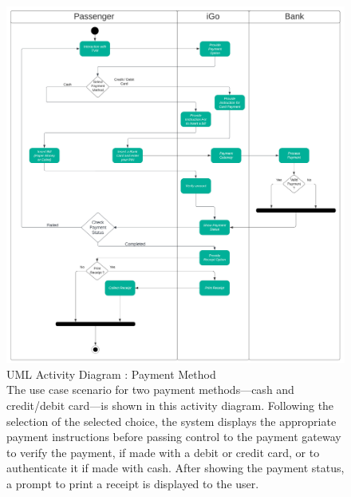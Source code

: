 \documentclass[a4paper, 11pt]{report}
\begin{document}
\begin{figure}[h]
    \centering
    \includegraphics[scale=0.15]{Activity_Diagram_Payment_Method.png}
    \caption{UML Activity Diagram : Payment Method\\ 
    The use case scenario for two payment methods—cash and credit/debit card—is shown in this activity diagram. Following the selection of the selected choice, the system displays the appropriate payment instructions before passing control to the payment gateway to verify the payment, if made with a debit or credit card, or to authenticate it if made with cash. After showing the payment status, a prompt to print a receipt is displayed to the user.}
    \label{fig:Activity Diagram Payment Method}
\end{figure}
\end{document}
